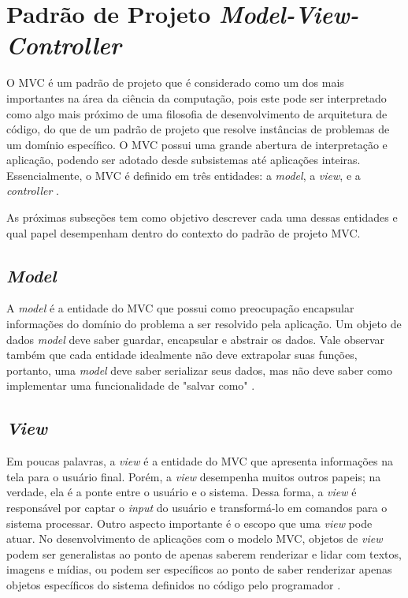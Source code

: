 \section{Padrão de Projeto \textit{Model-View-Controller}}

O MVC é um padrão de projeto que é considerado como um dos mais importantes na área da ciência da computação, pois este pode ser interpretado como algo mais próximo de uma filosofia de desenvolvimento de arquitetura de código, do que de um padrão de projeto que resolve instâncias de problemas de um domínio específico. O MVC possui uma grande abertura de interpretação e aplicação, podendo ser adotado desde subsistemas até aplicações inteiras. Essencialmente, o MVC é definido em três entidades: a \textit{model}, a \textit{view}, e a \textit{controller} \cite{Bucanek2009}.

As próximas subseções tem como objetivo descrever cada uma dessas entidades e qual papel desempenham dentro do contexto do padrão de projeto MVC.

\subsection{\textit{Model}}

A \textit{model} é a entidade do MVC que possui como preocupação encapsular informações do domínio do problema a ser resolvido pela aplicação. Um objeto de dados \textit{model} deve saber guardar, encapsular e abstrair os dados. Vale observar também que cada entidade idealmente não deve extrapolar suas funções, portanto, uma \textit{model} deve saber serializar seus dados, mas não deve saber como implementar uma funcionalidade de "salvar como" \cite{Bucanek2009}.

\subsection{\textit{View}}

Em poucas palavras, a \textit{view} é a entidade do MVC que apresenta informações na tela para o usuário final. Porém, a \textit{view} desempenha muitos outros papeis; na verdade, ela é a ponte entre o usuário e o sistema. Dessa forma, a \textit{view} é responsável por captar o \textit{input} do usuário e transformá-lo em comandos para o sistema processar. Outro aspecto importante é o escopo que uma \textit{view} pode atuar. No desenvolvimento de aplicações com o modelo MVC, objetos de \textit{view} podem ser generalistas ao ponto de apenas saberem renderizar e lidar com textos, imagens e mídias, ou podem ser específicos ao ponto de saber renderizar apenas objetos específicos do sistema definidos no código pelo programador \cite{Bucanek2009}.


